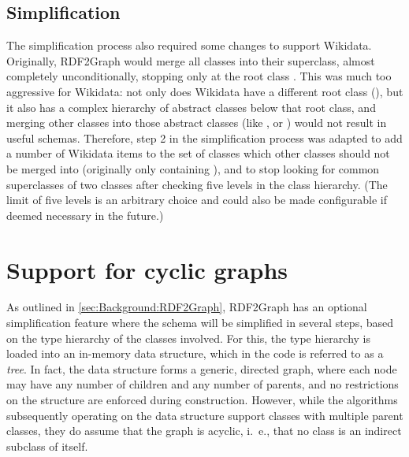 \subsection{Simplification}
\label{subsec:RDF2Graph+Wikidata:Wikidata:simplification}

The simplification process also required some changes to support Wikidata.
Originally, RDF2Graph would merge all classes into their superclass,
almost completely unconditionally,
stopping only at the root class .
This was much too aggressive for Wikidata:
not only does Wikidata have a different root class (),
but it also has a complex hierarchy of abstract classes below that root class,
and merging other classes into those abstract classes
(like ,  or )
would not result in useful schemas.
Therefore, step 2 in the simplification process was adapted %
to add a number of Wikidata items to the set of classes which other classes should not be merged into
(originally only containing ),
and to stop looking for common superclasses of two classes after checking five levels in the class hierarchy.
(The limit of five levels is an arbitrary choice
and could also be made configurable if deemed necessary in the future.) %

\section{Support for cyclic graphs}
\label{sec:RDF2Graph+Wikidata:cyclic-graphs}

As outlined in \cref{sec:Background:RDF2Graph}, %
RDF2Graph has an optional simplification feature
where the schema will be simplified in several steps,
based on the type hierarchy of the classes involved.
For this, the type hierarchy is loaded into an in-memory data structure,
which in the code is referred to as a \emph{tree}. %
In fact, the data structure forms a generic, directed graph,
where each node may have any number of children and any number of parents,
and no restrictions on the structure are enforced during construction.
However, while the algorithms subsequently operating on the data structure support classes with multiple parent classes,
they do assume that the graph is acyclic,
i.~e., that no class is an indirect subclass of itself.


